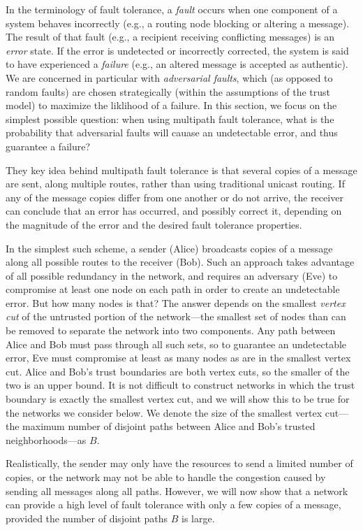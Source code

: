\documentclass{sig-alternate-05-2015}
\begin{document}
In the terminology of fault tolerance, a {\em fault} occurs when one component
of a system behaves incorrectly (e.g., a routing node blocking or
altering a message).
The result of that fault (e.g., a recipient receiving conflicting messages)
is an {\em error} state.
If the error is undetected or incorrectly corrected, the system is
said to have experienced a {\em failure} (e.g., an altered message is
accepted as authentic).
We are concerned in particular with {\em adversarial faults},
which (as opposed to random faults)
are chosen strategically (within the assumptions of the trust model)
to maximize the liklihood of a failure.
In this section, we focus on the simplest possible question:
when using multipath fault tolerance,
what is the probability that adversarial faults will cauase an undetectable
error, and thus guarantee a failure?

They key idea behind multipath fault tolerance is that several copies of
a message are sent, along multiple routes,
rather than using traditional unicast routing.
If any of the message copies differ from one another or do not arrive,
the receiver can conclude that an error has occurred,
and possibly correct it, depending on the magnitude of the error
and the desired fault tolerance properties.

In the simplest such scheme, a sender (Alice) broadcasts copies of a message
along all possible routes to the receiver (Bob).
Such an approach takes advantage of all possible redundancy in the network,
and requires an adversary (Eve) to compromise at least one node on each path
in order to create an undetectable error.
But how many nodes is that?
The answer depends on the smallest {\em vertex cut} of the untrusted
portion of the network---the smallest set of nodes than can be removed
to separate the network into two components.
Any path between Alice and Bob must pass through all such sets,
so to guarantee an undetectable error, Eve must compromise at least as many
nodes as are in the smallest vertex cut.
Alice and Bob's trust boundaries are both vertex cuts,
so the smaller of the two is an upper bound.
It is not difficult to construct networks in which the trust boundary is exactly
the smallest vertex cut,
and we will show this to be true for the networks we consider below.
We denote the size of the smallest vertex cut---the
maximum number of disjoint paths between Alice and Bob's trusted
neighborhoods---as $B$.

Realistically, the sender may only have the resources to send a limited number of
copies, or the network may not be able to handle the congestion caused by
sending all messages along all paths.
However, we will now show that a network can provide a high level of
fault tolerance with only a few copies of a message,
provided the number of disjoint paths $B$ is large.
\end{document}
